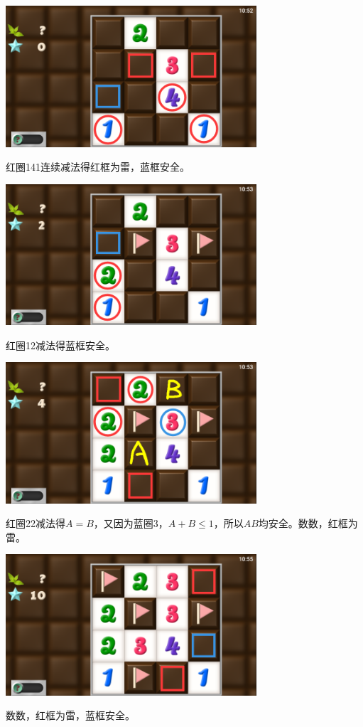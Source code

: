 \subsection{} %
\begin{center}
    \includegraphics[width=0.7\textwidth]{puzzle/123-1.png}
\end{center}
红圈141连续减法得红框为雷，蓝框安全。
\begin{center}
    \includegraphics[width=0.7\textwidth]{puzzle/123-2.png}
\end{center}
红圈12减法得蓝框安全。
\begin{center}
    \includegraphics[width=0.7\textwidth]{puzzle/123-3.png}
\end{center}
红圈22减法得$A=B$，又因为蓝圈3，$A+B\le 1$，所以$AB$均安全。数数，红框为雷。
\begin{center}
    \includegraphics[width=0.7\textwidth]{puzzle/123-4.png}
\end{center}
数数，红框为雷，蓝框安全。

